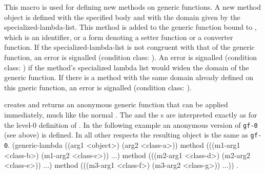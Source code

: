\begin{optDefinition}
\Syntax
{}%
%
%
\remarks%
This macro is used for defining new methods on generic functions.  A new method
object is defined with the specified body and with the domain given by the
specialized-lambda-list.  This method is added to the generic function bound to
, which is an identifier, or a form denoting a setter function or
a converter function. If the specialized-lambda-list is not congruent with that
of the generic function, an error is signalled (condition class:
).  An error is signalled (condition
class: 
) if the method's specialized lambda
list would widen the domain of the generic function.  If there is a method with
the same domain already defined on this gneric function, an error is signalled
(condition class:
).

\Syntax
{}%
%
\remarks%
 creates and returns an anonymous generic function that
can be applied immediately, much like the normal .  The
 and the s are interpreted
exactly as for the level-0 definition of .  \examples In
the following example an anonymous version of {\tt gf-0} (see
 above) is defined.  In all other respects the resulting
object is the same as {\tt gf-0}.
%
{\syntax
(generic-lambda ((arg1 <object>)
                 (arg2 <class-a>))
  method (((m1-arg1 <class-b>)
           (m1-arg2 <class-c>)) ...)
  method (((m2-arg1 <class-d>)
           (m2-arg2 <class-e>)) ...)
  method (((m3-arg1 <class-f>)
           (m3-arg2 <class-g>)) ...))
\endsyntax}
%
\seealso%
.
%
\end{optDefinition}

